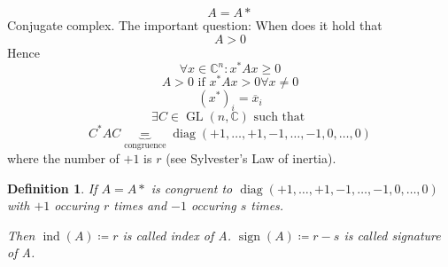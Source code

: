 \documentclass[a4paper]{article}
\newcounter{lecref}[section]
\numberwithin{lecref}{section}
\newtheorem{definition}[lecref]{Definition}
\DeclareMathOperator{\sign}{sign}
\begin{document}
\[ A = A* \]
Conjugate complex. The important question: When does it hold that
\[ A > 0 \]
Hence
\[ \forall x \in \mathbb C^n: x^* A x \geq 0 \]
\[ A > 0 \text{ if } x^* A x > 0 \forall x \neq 0 \]
\[ (x^*)_i = \overline{x}_i \]
\[ \exists C \in \operatorname{GL}(n, \mathbb C) \text{ such that } \]
\[ C^* AC \underbrace{=}_{\text{congruence}} %
  \operatorname{diag}(+1, \dots, +1, -1, \dots, -1, 0, \dots, 0)
\]
where the number of $+1$ is $r$ (see Sylvester's Law of inertia).

\begin{definition} %
  If $A = A*$ is congruent to
  $
    \operatorname{diag}(+1, \dots, +1, -1, \dots, -1, 0, \dots, 0)
  $
  with $+1$ occuring $r$ times and $-1$ occuring $s$ times.

  Then $\operatorname{ind}(A) \coloneqq r$ is called \emph{index of A}.
  $\sign(A) \coloneqq r - s$ is called \emph{signature of A}.
\end{definition}
\end{document}

